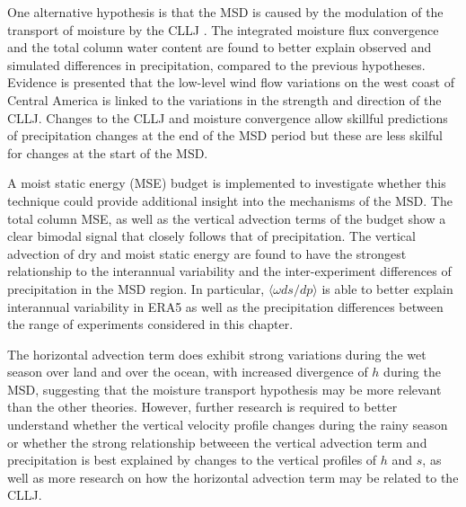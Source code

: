 One alternative hypothesis is that the MSD is caused by the modulation of the transport of moisture by the CLLJ \citep{herrera2015,zermeno2019,martinez2019}. The integrated moisture flux convergence and the total column water content are found to better explain observed and simulated differences in precipitation, compared to the previous hypotheses. Evidence is presented that the low-level wind flow variations on the west coast of Central America is linked to the variations in the strength and direction of the CLLJ. 
Changes to the CLLJ and moisture convergence allow skillful predictions of precipitation changes at the end of the MSD period but these are less skilful for changes at the start of the MSD. 

A moist static energy (MSE) budget is implemented to investigate whether this technique could provide additional insight into the mechanisms of the MSD. The total column MSE, as well as the vertical advection terms of the budget show a clear bimodal signal that closely follows that of precipitation. The vertical advection of dry and moist static energy are found to have the strongest relationship to the interannual variability and the inter-experiment differences of precipitation in the MSD region. 
In particular, $\langle \omega ds/dp \rangle$ is able to better explain interannual variability in ERA5 as well as the precipitation differences between the range of experiments considered in this chapter. 

The horizontal advection term does exhibit strong variations during the wet season over land and over the ocean, with increased divergence of $h$ during the MSD, suggesting that the moisture transport hypothesis may be more relevant than the other theories. 
However, further research is required to better understand whether the vertical velocity profile changes during the rainy season or whether the strong relationship betweeen the vertical advection term and precipitation is best explained by changes to the vertical profiles of $h$ and $s$, as well as more research on how the horizontal advection term may be related to the CLLJ.
 
 
